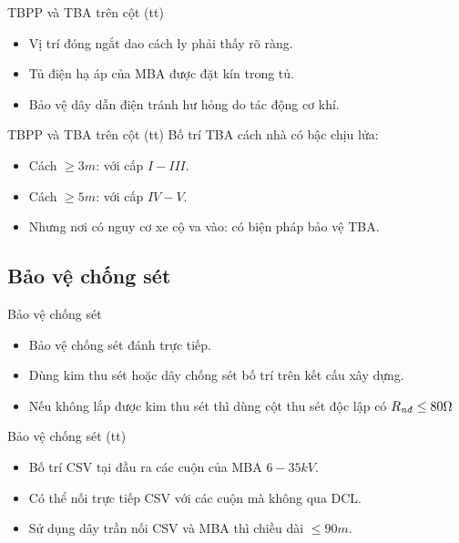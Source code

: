 \documentclass[20pt]{beamer}
\begin{document}
\begin{frame}{TBPP và TBA trên cột (tt)}
	\begin{itemize}
		\justifying		
		\item Vị trí đóng ngắt dao cách ly phải thấy rõ ràng.
		\item Tủ điện hạ áp của MBA được đặt kín trong tủ.
		\item Bảo vệ dây dẫn điện tránh hư hỏng do tác động cơ khí.
	\end{itemize}
\end{frame}

\begin{frame}{TBPP và TBA trên cột (tt)}
	Bố trí TBA cách nhà có bậc chịu lửa:
	\begin{itemize}
		\justifying		
			\item Cách $\geq 3m$: với cấp $I-III$.
			\item Cách $\geq 5m$: với cấp $IV-V$.
			\item Nhưng nơi có nguy cơ xe cộ va vào: có biện pháp bảo vệ TBA.
	\end{itemize}
\end{frame}

\subsection*{Bảo vệ chống sét}
\begin{frame}{Bảo vệ chống sét}
	\begin{itemize}
		\justifying
		\item Bảo vệ \alert{chống sét đánh trực tiếp}.
		\item Dùng \alert{kim thu sét} hoặc \alert{dây chống sét} bố trí trên kết cấu xây dựng.
		\item Nếu không lắp được kim thu sét thì dùng cột thu sét độc lập có $R_{\text{\textit{nđ}}} \leq 80\Omega$		
	\end{itemize}
\end{frame}

\begin{frame}{Bảo vệ chống sét (tt)}
	\begin{itemize}
		\item Bố trí CSV tại đầu ra các cuộn của MBA $6-35kV$.
		\item Có thể nối trực tiếp CSV với các cuộn mà không qua DCL.
		\item Sử dụng \alert{dây trần} nối CSV và MBA thì chiều dài $\leq 90m$.
	\end{itemize}
\end{frame}
\end{document}
